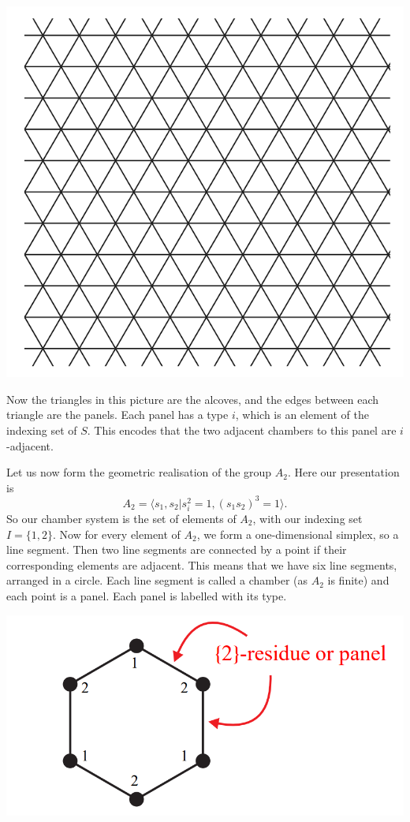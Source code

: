 \documentclass[11pt]{article}
\begin{document}
\begin{center}
    \includegraphics[scale=0.5]{Screenshot 2023-03-28 114008.png}\\
\end{center}

Now the triangles in this picture are the alcoves, and the edges between each triangle are the panels. Each panel has a type $i$, which is an element of the indexing set of $S$. This encodes that the two adjacent chambers to this panel are $i$-adjacent. 


Let us now form the geometric realisation of the group $A_2$. Here our presentation is 
\[A_2=\langle s_1,s_2|s_i^2=1, (s_1s_2)^3=1\rangle.\]
So our chamber system is the set of elements of $A_2$, with our indexing set $I=\{1,2\}$. Now for every element of $A_2$, we form a one-dimensional simplex, so a line segment. Then two line segments are connected by a point if their corresponding elements are adjacent. This means that we have six line segments, arranged in a circle. Each line segment is called a chamber (as $A_2$ is finite) and each point is a panel. Each panel is labelled with its type.

\begin{center}
    \includegraphics[scale=0.5]{Screenshot 2023-03-21 135437.png}\\
\end{center}
\end{document}
